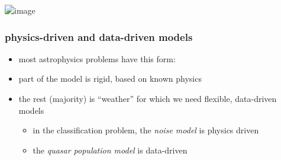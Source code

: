 \documentclass[pdftex]{beamer}
\begin{document}
\begin{frame}
\includegraphics<1>[height=\textheight]{../engineering/xdqso.png}
\end{frame}


\begin{frame}
  \frametitle{physics-driven and data-driven models}
  \begin{itemize}
  \item most astrophysics problems have this form:
  \item part of the model is rigid, based on known physics
  \item the rest (majority) is ``weather'' for which we need flexible, data-driven models
    \begin{itemize}
    \item in the classification problem, the \emph{noise model} is physics driven
    \item the \emph{quasar population model} is data-driven
    \end{itemize}
  \end{itemize}
\end{frame}
\end{document}
